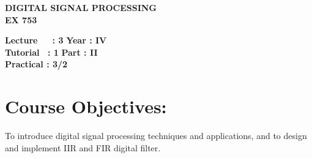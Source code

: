 \begin{center}
    \textbf{\huge{\uppercase{Digital Signal Processing}}}
    \\
    \vspace{.5cm}
    \textbf{\large{EX 753}}
\end{center}

\noindent\textbf{Lecture\ \ \ : 3} \hfill \textbf{Year : IV} \\
\textbf{Tutorial \ : 1} \hfill \textbf{Part : II } \\
\textbf{Practical : 3/2}  \\

\par
\noindent 
\section*{Course Objectives:}
To introduce digital signal processing techniques and applications, and to design and implement IIR and FIR digital filter.


